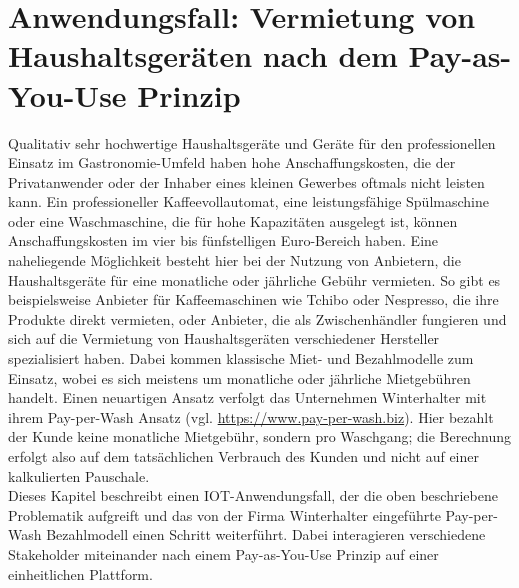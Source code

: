 \chapter{Anwendungsfall: Vermietung von Haushaltsgeräten nach dem Pay-as-You-Use Prinzip}
\label{ch:iot_usecase}
Qualitativ sehr hochwertige Haushaltsgeräte und Geräte für den professionellen Einsatz im Gastronomie-Umfeld haben hohe Anschaffungskosten, die der Privatanwender oder der Inhaber eines kleinen Gewerbes oftmals nicht leisten kann. Ein professioneller Kaffeevollautomat, eine leistungsfähige Spülmaschine oder eine Waschmaschine, die für hohe Kapazitäten ausgelegt ist, können Anschaffungskosten im vier bis fünfstelligen Euro-Bereich haben. Eine naheliegende Möglichkeit besteht hier bei der Nutzung von Anbietern, die Haushaltsgeräte für eine monatliche oder jährliche Gebühr vermieten. So gibt es beispielsweise Anbieter für Kaffeemaschinen wie Tchibo oder Nespresso, die ihre Produkte direkt vermieten, oder Anbieter, die als Zwischenhändler fungieren und sich auf die Vermietung von Haushaltsgeräten verschiedener Hersteller spezialisiert haben. Dabei kommen klassische Miet- und Bezahlmodelle zum Einsatz, wobei es sich meistens um monatliche oder jährliche Mietgebühren handelt. Einen neuartigen Ansatz verfolgt das Unternehmen Winterhalter mit ihrem Pay-per-Wash Ansatz (vgl. \url{https://www.pay-per-wash.biz}). Hier bezahlt der Kunde keine monatliche Mietgebühr, sondern pro Waschgang; die Berechnung erfolgt also auf dem tatsächlichen Verbrauch des Kunden und nicht auf einer kalkulierten Pauschale.\\
Dieses Kapitel beschreibt einen IOT-Anwendungsfall, der die oben beschriebene Problematik aufgreift und das von der Firma Winterhalter eingeführte Pay-per-Wash Bezahlmodell einen Schritt weiterführt. Dabei interagieren verschiedene Stakeholder miteinander nach einem Pay-as-You-Use Prinzip auf einer einheitlichen Plattform.

%
%
